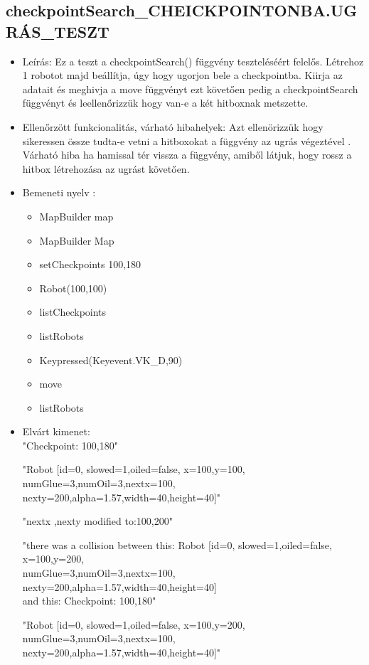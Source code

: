 \subsection{checkpointSearch\_CHEICKPOINTONBA.UGRÁS\_TESZT}
\begin{itemize}
	\item Leírás: Ez a teszt a checkpointSearch() függvény teszteléséért felelős.
			Létrehoz 1 robotot majd beállítja, úgy hogy ugorjon bele a checkpointba.
			Kiirja az adatait  és meghivja a move függvényt ezt követően pedig a checkpointSearch függvényt és leellenőrizzük hogy van-e a két hitboxnak metszette.\newline
	\item Ellenőrzött funkcionalitás, várható hibahelyek: Azt ellenörizzük hogy sikeressen össze tudta-e vetni a hitboxokat a függvény az ugrás                     végeztével .
	        Várható hiba ha hamissal tér vissza a függvény, amiből látjuk, hogy rossz a hitbox létrehozása  az ugrást követően.
	\item Bemeneti nyelv :
		\begin{itemize}
\item MapBuilder map
        \item MapBuilder Map
        \item setCheckpoints 100,180
		\item Robot(100,100)
		\item listCheckpoints
		\item listRobots
		\item Keypressed(Keyevent.VK\_D,90)
		\item move
		\item listRobots
		\end{itemize}

	\item Elvárt kimenet: \\
	    "Checkpoint: 100,180"\newline
	    
		"Robot [id=0,  slowed=1,oiled=false, x=100,y=100, 
		\\numGlue=3,numOil=3,nextx=100,
		\\nexty=200,alpha=1.57,width=40,height=40]"\newline
		
		"nextx ,nexty modified to:100,200"\newline
		
		 "there was a collision between this: Robot [id=0,  slowed=1,oiled=false, x=100,y=200, 
		\\numGlue=3,numOil=3,nextx=100,
		\\nexty=200,alpha=1.57,width=40,height=40]
		\\and this: 
		  Checkpoint: 100,180"\newline
	
		 "Robot [id=0,  slowed=1,oiled=false, x=100,y=200, 
		\\numGlue=3,numOil=3,nextx=100,
		\\nexty=200,alpha=1.57,width=40,height=40]"\newline
	
\end{itemize}
\pagebreak
